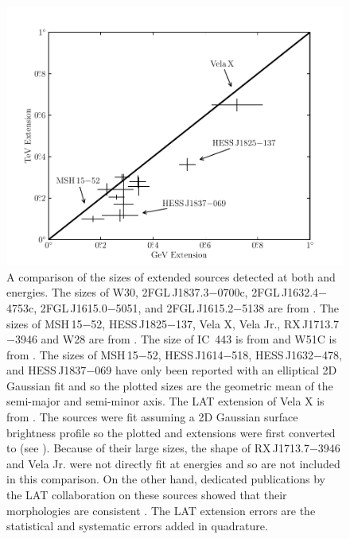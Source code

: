 \begin{figure}[htbp]
  \includegraphics{chapters/extended_search/figures/summary_plots/gev_vs_tev_plot_color.pdf}
  \caption{A comparison of the sizes of extended sources
  detected at both \gev and \tev energies.  The \tev sizes
  of W30, 2FGL\,J1837.3$-$0700c, 2FGL\,J1632.4$-$4753c,
  2FGL\,J1615.0$-$5051, and 2FGL\,J1615.2$-$5138 are from
  \cite{aharonian_2006a_h.e.s.s.-survey}.  The \tev sizes of MSH\,15$-$52,
  HESS\,J1825$-$137, Vela X, Vela Jr., RX\,J1713.7$-$3946 and W28 are from
  \cite{aharonian_2005a_discovery-extended,aharonian_2006a_energy-dependent,aharonian_2006a_first-detection,aharonian_2007a_h.e.s.s.-observations,aharonian_2007a_primary-particle,aharonian_2008a_discovery-energy}.
  The \tev size of IC~443 is from
  \cite{acciari_2009a_observation-extended} and W51C is from
  \cite{krause_2011a_probing-proton}.  The \tev sizes of MSH\,15$-$52,
  HESS\,J1614$-$518, HESS\,J1632$-$478, and HESS\,J1837$-$069 have only
  been reported with an elliptical 2D Gaussian fit and so the plotted
  sizes are the geometric mean of the semi-major and semi-minor axis.  The
  LAT extension of Vela X is from \cite{abdo_2010c_fermi-large}.  The \tev
  sources were fit assuming a 2D Gaussian surface brightness profile so
  the plotted \gev and \tev extensions were first converted to \rsixeight
  (see ).  Because of their large sizes,
  the shape of RX\,J1713.7$-$3946 and Vela Jr.  were not directly fit
  at \tev energies and so are not included in this comparison. On
  the other hand, dedicated publications by the LAT collaboration
  on these sources showed that their morphologies are consistent
  \citep{abdo_2011a_observations-young,tanaka_2011a_gamma-ray-observations}.
  The LAT extension errors are the statistical and systematic errors
  added in quadrature.}
\end{figure}

